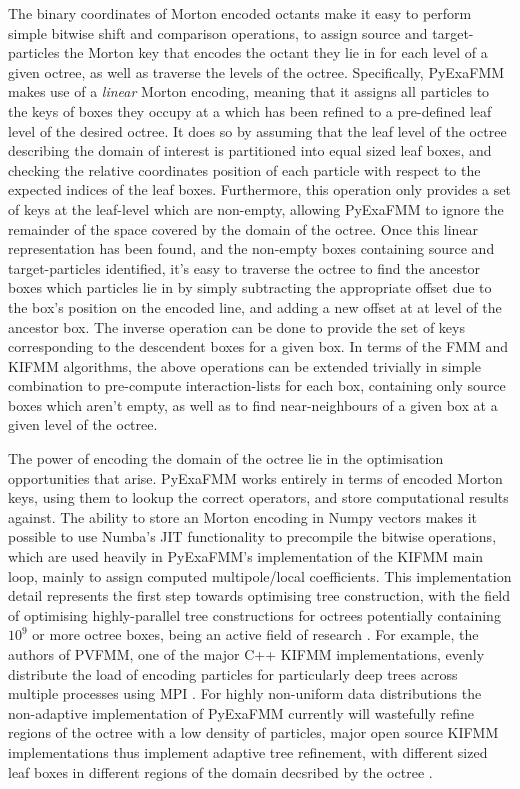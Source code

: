 The binary coordinates of Morton encoded octants make it easy to perform simple
bitwise shift and comparison operations, to assign source and \gls{target-particles} the Morton key
that encodes the octant they lie in for each level of a given octree, as well as traverse the levels of
the octree. Specifically, \gls{PyExaFMM} makes use of a \textit{linear} Morton encoding, meaning that it assigns
all particles to the keys of boxes they occupy at a which has been refined to a
pre-defined leaf level of the desired octree. It does so by assuming that the
leaf level of the octree describing the domain of interest is partitioned into equal
sized leaf boxes, and checking the relative coordinates position of each particle
with respect to the expected indices of the leaf boxes. Furthermore, this operation only provides
a set of keys at the leaf-level which are non-empty, allowing \gls{PyExaFMM} to
ignore the remainder of the space covered by the domain of the octree. Once this
linear representation has been found, and the non-empty boxes containing
source and \gls{target-particles} identified, it's easy to traverse the octree
to find the ancestor boxes which particles lie in by simply subtracting the appropriate
offset due to the box's position on the encoded line, and adding a new offset at
at level of the ancestor box. The inverse operation can be done to provide the set
of keys corresponding to the descendent boxes for a given box. In terms of the
\gls{FMM} and \gls{KIFMM} algorithms, the above operations can be extended trivially
in simple combination to pre-compute \gls{interaction-list}s for each box, containing
only source boxes which aren't empty, as well as to find \gls{near-neighbours} of
a given box at a given level of the octree.

The power of encoding the domain of the octree lie in the optimisation opportunities
that arise. \gls{PyExaFMM} works entirely in terms of encoded Morton keys, using
them to lookup the correct operators, and store computational results against.
The ability to store an Morton encoding in Numpy vectors makes it possible to use
Numba's \gls{JIT} functionality to precompile the bitwise
operations, which are used heavily in \gls{PyExaFMM}'s implementation of the \gls{KIFMM}
main loop, mainly to assign computed multipole/local coefficients. This implementation
detail represents the first step towards optimising tree construction, with the
field of optimising highly-parallel tree constructions for octrees potentially containing
$10^9$ or more octree boxes, being an active field of research \cite{Sundar:2008:SIAM,Malhotra:2015:CCP}.
For example, the authors of PVFMM, one of the major C++ \gls{KIFMM} implementations,
evenly distribute the load of encoding particles for particularly deep trees across
multiple processes using \gls{MPI} \cite{Malhotra:2015:CCP}. For highly non-uniform
data distributions the non-adaptive implementation of \gls{PyExaFMM} currently
will wastefully refine regions of the octree with a low density of particles, major
open source \gls{KIFMM} implementations thus implement adaptive tree refinement,
with different sized leaf boxes in different regions of the domain decsribed by
the octree \cite{Ying:2004:JCP, Malhotra:2015:CCP, exafmm}.

